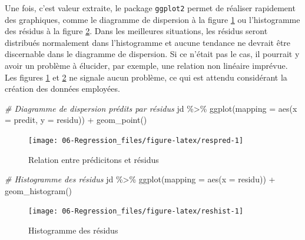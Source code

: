 \documentclass[
]{book}
\newenvironment{Shaded}{}{}
\newcommand{\AttributeTok}[1]{#1}
\newcommand{\CommentTok}[1]{\textit{#1}}
\newcommand{\FunctionTok}[1]{#1}
\newcommand{\NormalTok}[1]{#1}
\newcommand{\SpecialCharTok}[1]{#1}
\begin{document}
Une fois, c'est valeur extraite, le package \texttt{ggplot2} permet de réaliser rapidement des graphiques, comme le diagramme de dispersion à la figure \ref{fig:respred} ou l'histogramme des résidus à la figure \ref{fig:reshist}. Dans les meilleures situations, les résidus seront distribués normalement dans l'histogramme et aucune tendance ne devrait être discernable dans le diagramme de dispersion. Si ce n'était pas le cas, il pourrait y avoir un problème à élucider, par exemple, une relation non linéaire imprévue. Les figures \ref{fig:respred} et \ref{fig:reshist} ne signale aucun problème, ce qui est attendu considérant la création des données employées.

\begin{Shaded}
\begin{Highlighting}[]
\CommentTok{\# Diagramme de dispersion prédits par résidus}
\NormalTok{jd }\SpecialCharTok{\%\textgreater{}\%} 
  \FunctionTok{ggplot}\NormalTok{(}\AttributeTok{mapping =} \FunctionTok{aes}\NormalTok{(}\AttributeTok{x =}\NormalTok{ predit, }\AttributeTok{y =}\NormalTok{ residu)) }\SpecialCharTok{+} 
  \FunctionTok{geom\_point}\NormalTok{() }
\end{Highlighting}
\end{Shaded}

\begin{figure}

{\centering \texttt{[image: 06-Regression\_files/figure-latex/respred-1]} 

}

\caption{Relation entre prédicitons et résidus}\label{fig:respred}
\end{figure}

\begin{Shaded}
\begin{Highlighting}[]
\CommentTok{\# Histogramme des résidus}
\NormalTok{jd }\SpecialCharTok{\%\textgreater{}\%} 
  \FunctionTok{ggplot}\NormalTok{(}\AttributeTok{mapping =} \FunctionTok{aes}\NormalTok{(}\AttributeTok{x =}\NormalTok{ residu)) }\SpecialCharTok{+} 
  \FunctionTok{geom\_histogram}\NormalTok{()}
\end{Highlighting}
\end{Shaded}

\begin{figure}

{\centering \texttt{[image: 06-Regression\_files/figure-latex/reshist-1]} 

}

\caption{Histogramme des résidus}\label{fig:reshist}
\end{figure}
\end{document}
